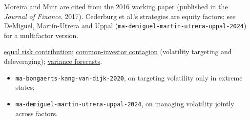 \begin{qfevidence}
 Moreira and Muir are cited from the 2016 working paper (published in the \emph{Journal of Finance}, 2017). Cederburg et al.'s strategies are equity factors; see DeMiguel, Martín-Utrera and Uppal (\nolinkurl{ma-demiguel-martin-utrera-uppal-2024}) for a multifactor version.

 \hyperref[meth:equal-risk-contribution]{equal risk contribution}; \hyperref[def:common-investor-contagion]{common-investor contagion} (volatility targeting and deleveraging); \hyperref[mod:garch-volatility-forecast]{variance forecasts}.

\begin{itemize}
\item \nolinkurl{ma-bongaerts-kang-van-dijk-2020}, on targeting volatility only in extreme states;
\item \nolinkurl{ma-demiguel-martin-utrera-uppal-2024}, on managing volatility jointly across factors. \end{itemize}

\end{qfevidence}

